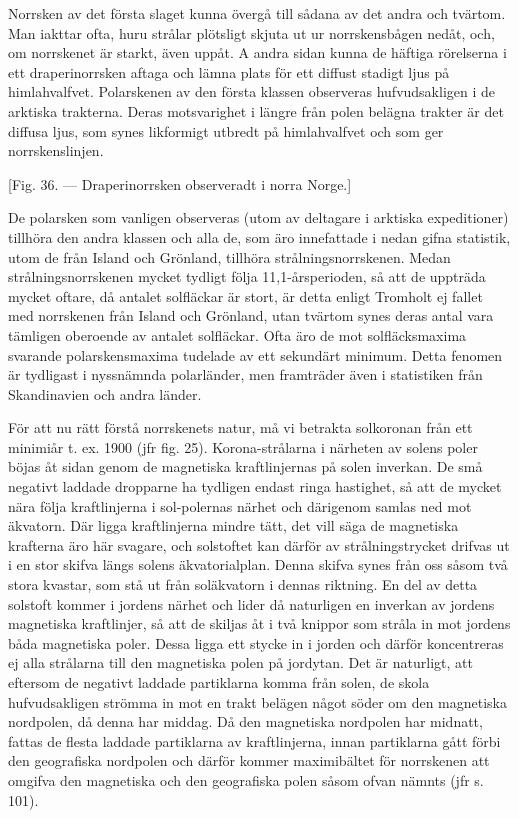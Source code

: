\documentclass[a4paper, 12pt, oneside, swedish]{article}
\begin{document}
Norrsken av det första slaget kunna övergå till sådana av det andra och tvärtom. Man iakttar ofta, huru strålar plötsligt skjuta ut ur norrskensbågen nedåt, och, om norrskenet är starkt, även uppåt. A andra sidan kunna de häftiga rörelserna i ett draperinorrsken aftaga och lämna plats för ett diffust stadigt ljus på himlahvalfvet. Polarskenen av den första klassen observeras hufvudsakligen i de arktiska trakterna. Deras motsvarighet i längre från polen belägna trakter är det diffusa ljus, som synes likformigt utbredt på himlahvalfvet och som ger norrskenslinjen.

[Fig. 36. --- Draperinorrsken observeradt i norra Norge.]

De polarsken som vanligen observeras (utom av deltagare i arktiska expeditioner) tillhöra den andra klassen och alla de, som äro innefattade i nedan gifna statistik, utom de från Island och Grönland, tillhöra strålningsnorrskenen. Medan strålningsnorrskenen mycket tydligt följa 11,1-årsperioden, så att de uppträda mycket oftare, då antalet solfläckar är stort, är detta enligt Tromholt ej fallet med norrskenen från Island och Grönland, utan tvärtom synes deras antal vara tämligen oberoende av antalet solfläckar. Ofta äro de mot solfläcksmaxima svarande polarskensmaxima tudelade av ett sekundärt minimum. Detta fenomen är tydligast i nyssnämnda polarländer, men framträder även i statistiken från Skandinavien och andra länder.

För att nu rätt förstå norrskenets natur, må vi betrakta solkoronan från ett minimiår t. ex. 1900 (jfr fig. 25). Korona-strålarna i närheten av solens poler böjas åt sidan genom de magnetiska kraftlinjernas på solen inverkan. De små negativt laddade dropparne ha tydligen endast ringa hastighet, så att de mycket nära följa kraftlinjerna i sol-polernas närhet och därigenom samlas ned mot äkvatorn. Där ligga kraftlinjerna mindre tätt, det vill säga de magnetiska krafterna äro här svagare, och solstoftet kan därför av strålningstrycket drifvas ut i en stor skifva längs solens äkvatorialplan. Denna skifva synes från oss såsom två stora kvastar, som stå ut från soläkvatorn i dennas riktning. En del av detta solstoft kommer i jordens närhet och lider då naturligen en inverkan av jordens magnetiska kraftlinjer, så att de skiljas åt i två knippor som stråla in mot jordens båda magnetiska poler. Dessa ligga ett stycke in i jorden och därför koncentreras ej alla strålarna till den magnetiska polen på jordytan. Det är naturligt, att eftersom de negativt laddade partiklarna komma från solen, de skola hufvudsakligen strömma in mot en trakt belägen något söder om den magnetiska nordpolen, då denna har middag. Då den magnetiska nordpolen har midnatt, fattas de flesta laddade partiklarna av kraftlinjerna, innan partiklarna gått förbi den geografiska nordpolen och därför kommer maximibältet för norrskenen att omgifva den magnetiska och den geografiska polen såsom ofvan nämnts (jfr s. 101).
\end{document}
